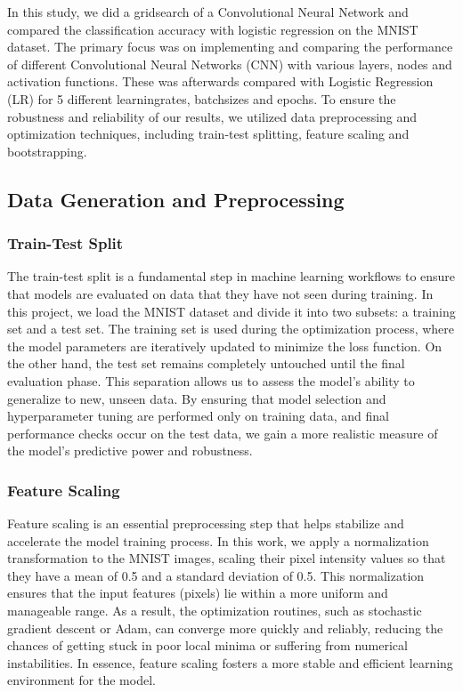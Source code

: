In this study, we did a gridsearch of a Convolutional Neural Network and compared the classification accuracy with logistic regression on the MNIST dataset. The primary focus was on implementing and comparing the performance of different Convolutional Neural Networks (CNN) with various layers, nodes and activation functions. These was afterwards compared with Logistic Regression (LR) for 5 different learningrates, batchsizes and epochs. To ensure the robustness and reliability of our results, we utilized data preprocessing and optimization techniques, including train-test splitting, feature scaling and bootstrapping. 

\subsection{Data Generation and Preprocessing}

\subsubsection{Train-Test Split}

The train-test split is a fundamental step in machine learning workflows to ensure that models are evaluated on data that they have not seen during training. In this project, we load the MNIST dataset and divide it into two subsets: a training set and a test set. The training set is used during the optimization process, where the model parameters are iteratively updated to minimize the loss function. On the other hand, the test set remains completely untouched until the final evaluation phase. This separation allows us to assess the model’s ability to generalize to new, unseen data. By ensuring that model selection and hyperparameter tuning are performed only on training data, and final performance checks occur on the test data, we gain a more realistic measure of the model’s predictive power and robustness.

\subsubsection{Feature Scaling}

Feature scaling is an essential preprocessing step that helps stabilize and accelerate the model training process. In this work, we apply a normalization transformation to the MNIST images, scaling their pixel intensity values so that they have a mean of 0.5 and a standard deviation of 0.5. This normalization ensures that the input features (pixels) lie within a more uniform and manageable range. As a result, the optimization routines, such as stochastic gradient descent or Adam, can converge more quickly and reliably, reducing the chances of getting stuck in poor local minima or suffering from numerical instabilities. In essence, feature scaling fosters a more stable and efficient learning environment for the model.

